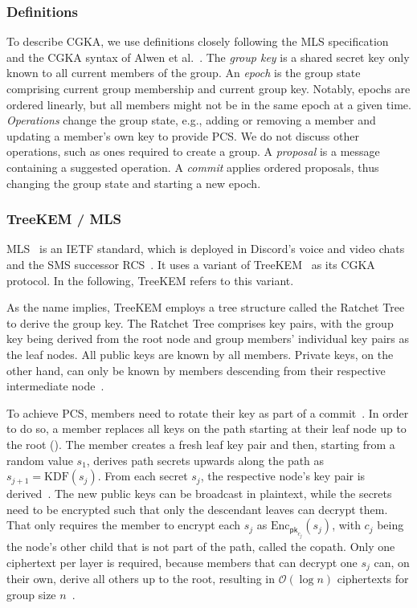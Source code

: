 \documentclass[conference]{IEEEtran}
\begin{document}
\subsubsection{Definitions}
To describe \ac{CGKA}, we use definitions closely following the \ac{MLS} specification~\cite{barnesMessagingLayerSecurity2023} and the \ac{CGKA} syntax of Alwen et al.~\cite{alwenContinuousGroupKey2020}.
The \emph{group key} is a shared secret key only known to all current members of the group.
An \emph{epoch} is the group state comprising current group membership and current group key.
Notably, epochs are ordered linearly, but all members might not be in the same epoch at a given time.
\emph{Operations} change the group state, e.g., adding or removing a member and updating a member's own key to provide \ac{PCS}.
We do not discuss other operations, such as ones required to create a group.
A \emph{proposal} is a message containing a suggested operation.
A \emph{commit} applies ordered proposals, thus changing the group state and starting a new epoch.

\subsubsection{TreeKEM / MLS}\label{sec:treekem}
\acf{MLS}~\cite{barnesMessagingLayerSecurity2023} is an \ac{IETF} standard, which is deployed in Discord's voice and video chats~\cite{discord2024dave_spec} and the \ac{SMS} successor \ac{RCS}~\cite{gsma2025rcs_e2ee}.
It uses a variant of TreeKEM~\cite{bhargavanTreeKEMAsynchronousDecentralizeda,solerAnalysisEfficiencyMessaging2025} as its \ac{CGKA} protocol.
In the following, TreeKEM refers to this variant.

As the name implies, TreeKEM employs a tree structure called the Ratchet Tree to derive the group key.
The Ratchet Tree comprises key pairs, with the group key being derived from the root node and group members' individual key pairs as the leaf nodes.
All public keys are known by all members.
Private keys, on the other hand, can only be known by members descending from their respective intermediate node~\cite{barnesMessagingLayerSecurity2023}.

To achieve \ac{PCS}, members need to rotate their key as part of a commit~\cite{barnesMessagingLayerSecurity2023}.
In order to do so, a member replaces all keys on the path starting at their leaf node up to the root ().
The member creates a fresh leaf key pair and then, starting from a random value $s_1$, derives path secrets upwards along the path as $s_{j+1} = \mathrm{KDF}(s_j)$.
From each secret $s_j$, the respective node's key pair is derived~\cite{barnesMessagingLayerSecurity2023}.
The new public keys can be broadcast in plaintext, while the secrets need to be encrypted such that only the descendant leaves can decrypt them.
That only requires the member to encrypt each $s_j$ as $\mathrm{Enc}_{\mathsf{pk}_{c_j}}(s_j)$, with $c_j$ being the node's other child that is not part of the path, called the copath.
Only one ciphertext per layer is required, because members that can decrypt one $s_j$ can, on their own, derive all others up to the root, resulting in $\mathcal{O}(\log n)$ ciphertexts for group size $n$~\cite{barnesMessagingLayerSecurity2023}.
\end{document}
